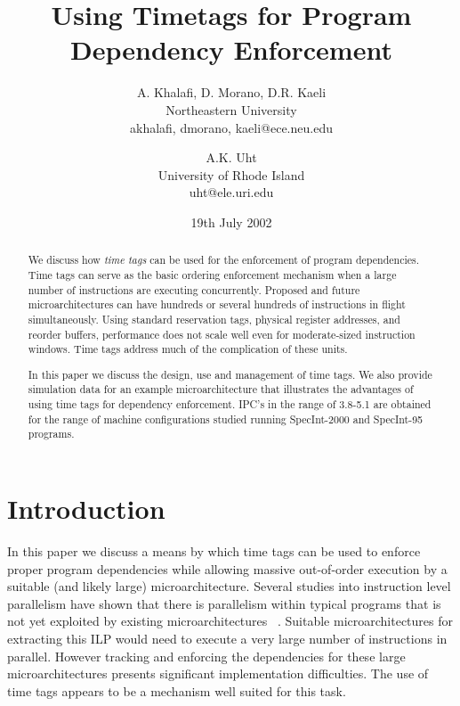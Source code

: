 \documentclass[10pt,twocolumn]{article}
\begin{document}
%
%
%
\title{Using Timetags for Program Dependency Enforcement}
%
\author{
A. Khalafi, D. Morano, D.R. Kaeli\\
Northeastern University\\
{akhalafi, dmorano, kaeli}@ece.neu.edu\\
\and
A.K. Uht\\
University of Rhode Island\\ 
uht@ele.uri.edu
}
%
%
\date{19th July 2002}
%
\maketitle
%
%
%
\begin{abstract}
We discuss how {\em time tags} can be used for the enforcement of
program dependencies.
Time tags can serve as the basic ordering enforcement mechanism
when a large number of instructions are executing concurrently.
Proposed and future microarchitectures can have hundreds or several hundreds
of instructions in flight simultaneously. Using standard 
reservation
tags, physical register addresses, and reorder buffers,
performance does not scale
well even for moderate-sized instruction windows.
Time tags address much of the complication of these units.

In this paper we discuss the
design, use and management of time tags.
We also provide simulation data for an example microarchitecture
that illustrates the
advantages of using time tags for dependency enforcement.  IPC's
in the range of 3.8-5.1 are obtained for the
range of machine configurations studied running SpecInt-2000 and
SpecInt-95 programs. 
\end{abstract}
%
%
\vspace{-0.25in}
\section{Introduction}
\vspace{-0.15in}
%
In this paper we discuss a means by which time tags can be used
to enforce proper program dependencies while allowing
massive out-of-order execution by a suitable (and likely large)
microarchitecture.
Several studies into instruction level parallelism
have shown that there is parallelism within
typical programs that is not yet exploited by existing
microarchitectures ~\cite{Gon97,Lam92,Uht95}.  
Suitable microarchitectures for extracting this ILP would need to
execute a very large number of instructions in parallel.
However tracking and enforcing the dependencies for these
large microarchitectures presents significant implementation
difficulties.  The use of time tags appears to be a mechanism well suited
for this task.
\end{document}
